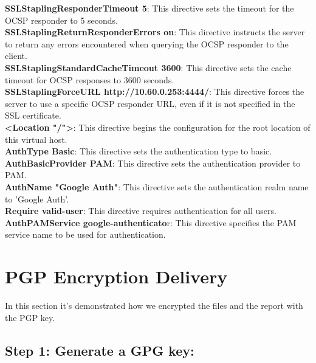 \documentclass[12pt]{article}
\begin{document}
\textbf{SSLStaplingResponderTimeout 5}: This directive sets the timeout for the OCSP responder to 5 seconds.\\

\textbf{SSLStaplingReturnResponderErrors on}: This directive instructs the server to return any errors encountered when querying the OCSP responder to the client.\\

\textbf{SSLStaplingStandardCacheTimeout 3600}: This directive sets the cache timeout for OCSP responses to 3600 seconds.\\

\textbf{SSLStaplingForceURL http://10.60.0.253:4444/}: This directive forces the server to use a specific OCSP responder URL, even if it is not specified in the SSL certificate.\\

\textbf{<Location "/">}: This directive begins the configuration for the root location of this virtual host.\\

\textbf{AuthType Basic}: This directive sets the authentication type to basic.\\

\textbf{AuthBasicProvider PAM}: This directive sets the authentication provider to PAM.\\

\textbf{AuthName "Google Auth"}: This directive sets the authentication realm name to 'Google Auth'.\\

\textbf{Require valid-user}: This directive requires authentication for all users.\\

\textbf{AuthPAMService google-authenticato}r: This directive specifies the PAM service name to be used for authentication.\\

\newpage

\section{PGP Encryption Delivery}
In this section it's demonstrated how we encrypted the files and the report with the PGP key.\\

\subsection{Step 1: Generate a GPG key:}
\end{document}
